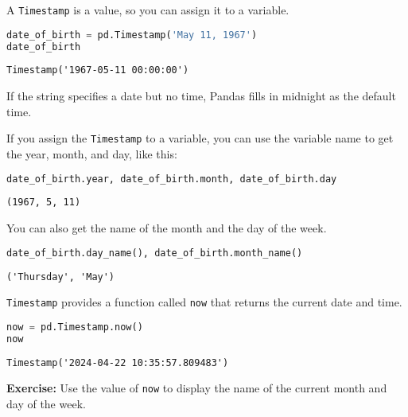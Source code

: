 A \passthrough{\lstinline!Timestamp!} is a value, so you can assign it
to a variable.

\begin{lstlisting}[language=Python,style=source]
date_of_birth = pd.Timestamp('May 11, 1967')
date_of_birth
\end{lstlisting}

\begin{lstlisting}[style=output]
Timestamp('1967-05-11 00:00:00')
\end{lstlisting}

If the string specifies a date but no time, Pandas fills in midnight as
the default time.

If you assign the \passthrough{\lstinline!Timestamp!} to a variable, you
can use the variable name to get the year, month, and day, like this:

\begin{lstlisting}[language=Python,style=source]
date_of_birth.year, date_of_birth.month, date_of_birth.day
\end{lstlisting}

\begin{lstlisting}[style=output]
(1967, 5, 11)
\end{lstlisting}

You can also get the name of the month and the day of the week.

\begin{lstlisting}[language=Python,style=source]
date_of_birth.day_name(), date_of_birth.month_name()
\end{lstlisting}

\begin{lstlisting}[style=output]
('Thursday', 'May')
\end{lstlisting}

\passthrough{\lstinline!Timestamp!} provides a function called
\passthrough{\lstinline!now!} that returns the current date and time.

\begin{lstlisting}[language=Python,style=source]
now = pd.Timestamp.now()
now
\end{lstlisting}

\begin{lstlisting}[style=output]
Timestamp('2024-04-22 10:35:57.809483')
\end{lstlisting}

\textbf{Exercise:} Use the value of \passthrough{\lstinline!now!} to
display the name of the current month and day of the week.

